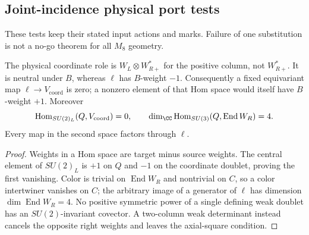 \documentclass[12pt,a4paper]{article}
\begin{document}
\subsection{Joint-incidence physical port tests}
\label{p5:app:joint-incidence-physical-port-tests}

These tests keep their stated input actions and marks.  Failure
of one substitution is not a no-go theorem for all \(M_8\)
geometry.

\begin{proposition}
\label{p5:prop:joint-incidence-linear-port-tests}
The physical coordinate role is \(W_L\otimes W_{R+}^*\)
for the positive column, not \(W_{R+}^*\).  It is neutral
under \(B\), whereas \(\ell\) has \(B\)-weight \(-1\).
Consequently a fixed equivariant map
\(\ell\to V_{\mathrm{coord}}\) is zero; a nonzero element
of that Hom space would itself have \(B\)-weight \(+1\).
Moreover
\[
 \operatorname{Hom}_{SU(2)_L}(Q,V_{\mathrm{coord}})=0,\qquad
 \dim_{\CC}\operatorname{Hom}_{SU(3)}(Q,\operatorname{End}W_R)=4.
\]
Every map in the second space factors through \(\ell\).
\end{proposition}
\begin{proof}
Weights in a Hom space are target minus source weights.
The central element of \(SU(2)_L\) is \(+1\) on \(Q\)
and \(-1\) on the coordinate doublet, proving the first
vanishing.  Color is trivial on \(\operatorname{End}W_R\)
and nontrivial on \(C\), so a color intertwiner vanishes
on \(C\); the arbitrary image of a generator of \(\ell\)
has dimension \(\dim\operatorname{End}W_R=4\).
No positive symmetric power of a single defining weak
doublet has an \(SU(2)\)-invariant covector.  A two-column
weak determinant instead cancels the opposite right
weights and leaves the axial-square condition.
\end{proof}
\end{document}
